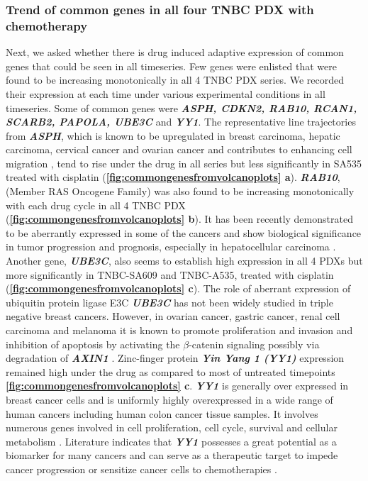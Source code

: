 
\subsubsection{Trend of common genes in all four TNBC PDX with  chemotherapy}
Next, we asked whether there is drug induced adaptive expression of common genes that could be seen in all timeseries. 
 Few genes were enlisted that were found to be increasing monotonically in all 4 TNBC PDX series. We recorded their expression at each time under various experimental conditions in all timeseries. Some of common genes were  \textit{\textbf{ASPH, CDKN2, RAB10, RCAN1, SCARB2, PAPOLA, UBE3C}} and \textit{\textbf{YY1}}. The representative line trajectories from \textit{\textbf{ASPH}}, which is known to be upregulated in breast carcinoma, hepatic carcinoma, cervical cancer and ovarian cancer and contributes to enhancing cell migration  \cite{zheng2020diverse,li2018expression, hou2018recent, lin2019asph}, tend to rise under the drug in all series but less significantly in SA535 treated with cisplatin (\textbf{\autoref{fig:commongenesfromvolcanoplots} a}). 
 \textit{\textbf{RAB10}}, (Member RAS Oncogene Family) was also found to be increasing monotonically with each drug cycle in all 4 TNBC PDX (\textbf{\autoref{fig:commongenesfromvolcanoplots} b}). It has been recently demonstrated to be aberrantly expressed in some of the cancers and show biological significance in tumor progression and prognosis, especially in hepatocellular carcinoma \cite{wang2017rab10, he2002identification, jiang2016mir}. 
Another gene,  \textit{\textbf{UBE3C}}, also seems to establish high expression in all 4 PDXs but more significantly in TNBC-SA609 and TNBC-A535, treated with cisplatin (\textbf{\autoref{fig:commongenesfromvolcanoplots} c}). The role of aberrant expression of ubiquitin protein ligase E3C \textit{\textbf{UBE3C}} has not been widely studied in triple negative breast cancers. However, in ovarian cancer, gastric cancer, renal cell carcinoma and melanoma it is known to promote proliferation and invasion and inhibition of apoptosis by activating the $\beta$-catenin signaling possibly via degradation of  \textbf{\textit{AXIN1}} \cite{xiong2019mir, pan2015ubiquitin, zhang2020ube3c}.
  Zinc-finger protein  \textit{\textbf{Yin Yang 1 (YY1)}}  expression remained high under the drug as compared to most of untreated timepoints \textbf{\autoref{fig:commongenesfromvolcanoplots} c}. \textit{\textbf{YY1}} is generally over expressed in breast cancer cells 
and is uniformly highly overexpressed in a wide range of human cancers including human colon cancer tissue samples. It involves numerous genes involved in cell proliferation, cell cycle, survival and cellular metabolism \cite{wan2012yin, chinnappan2009transcription, meliala2020biological}. Literature indicates that \textit{\textbf{YY1}} possesses a great potential as a biomarker for many cancers and can serve as a therapeutic target to impede cancer progression or sensitize cancer cells to chemotherapies \cite{wan2012yin, chinnappan2009transcription, meliala2020biological, shi2015role}.

